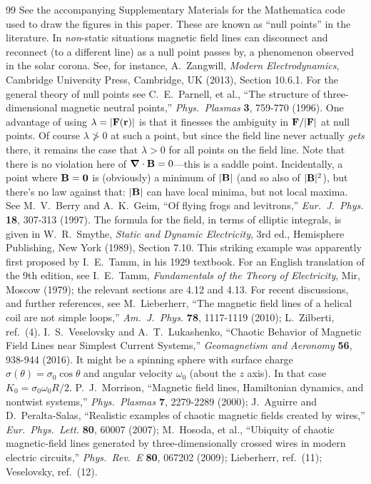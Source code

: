 \documentclass[aps,prb,twocolumn,groupedaddress,noshowpacs,checklength,amsmath]{revtex4-1}
\newcommand{\grad}{\mbox{\boldmath $\nabla$}}
\begin{document}
\begin{thebibliography}{99}
 See the accompanying Supplementary Materials for the Mathematica code used to draw the figures in this paper.
 These are known as ``null points'' in the literature.  In {\it non}-static situations magnetic field lines can disconnect and reconnect (to a different line) as a null point passes by, a phenomenon observed in the solar corona.  See, for instance, A.~Zangwill, {\it Modern Electrodynamics}, Cambridge University Press, Cambridge, UK (2013), Section 10.6.1.  For the general theory of null points see C.~E.~Parnell, et al., ``The structure of three-dimensional magnetic neutral points,'' {\it Phys.~Plasmas} {\bf 3}, 759-770 (1996). 
 One advantage of using $\lambda = |{\bf F}({\bf r})|$ is that it finesses the ambiguity in ${\bf F}/|{\bf F}|$ at null points.  Of course $\lambda \not> 0$ at such a point, but since the field line never actually {\it gets} there, it remains the case that $\lambda > 0$ for all points on the field line. 
  Note that there is no violation here of $\grad \cdot {\bf B}=0$---this is a saddle point.  Incidentally, a point where ${\bf B}={\bf 0}$ is (obviously) a minimum of $|{\bf B}|$ (and so also of $|{\bf B}|^2$), but there's no law against that: $|{\bf B}|$ can have local minima, but not local maxima.  See M.~V.~Berry and A.~K.~Geim, ``Of flying frogs and levitrons,'' {\it Eur.~J.~Phys.} {\bf 18}, 307-313 (1997).
 The formula for the field, in terms of elliptic integrals, is given in W.~R.~Smythe, {\it Static and Dynamic Electricity}, 3rd ed., Hemisphere Publishing, New York (1989), Section 7.10.
 This striking example was apparently first proposed by I.~E.~Tamm, in his 1929 textbook.  For an English translation of the 9th edition, see I.~E.~Tamm, {\it Fundamentals of the Theory of Electricity}, Mir, Moscow (1979); the relevant sections are 4.12 and 4.13.  For recent discussions, and further references, see M.~Lieberherr, ``The magnetic field lines of a helical coil are not simple loops,'' {\it Am.~J.~Phys.} {\bf 78}, 1117-1119 (2010); L.~Zilberti, ref.~(4).
 I.~S.~Veselovsky and A.~T.~Lukashenko, ``Chaotic Behavior of Magnetic Field Lines near Simplest Current Systems,'' {\it Geomagnetism and Aeronomy} {\bf 56}, 938-944 (2016).
 It might be a spinning sphere with surface charge $\sigma(\theta) = \sigma_0\cos\theta$ and angular velocity $\omega_0$ (about the $z$ axis).  In that case $K_0 = \sigma_0\omega_0R/2$.
 P.~J.~Morrison, ``Magnetic field lines, Hamiltonian dynamics, and nontwist systems,'' {\it Phys.~Plasmas} {\bf 7}, 2279-2289 (2000); J.~Aguirre and D.~Peralta-Salas, ``Realistic examples of chaotic magnetic fields created by wires,'' {\it Eur.~Phys.~Lett.} {\bf 80}, 60007 (2007); M.~Hosoda, et al., ``Ubiquity of chaotic magnetic-field lines generated by three-dimensionally crossed wires in modern electric circuits,'' {\it Phys.~Rev.~E} {\bf 80}, 067202 (2009); Lieberherr, ref.~(11); Veselovsky, ref.~(12).

\end{thebibliography}
\end{document}
